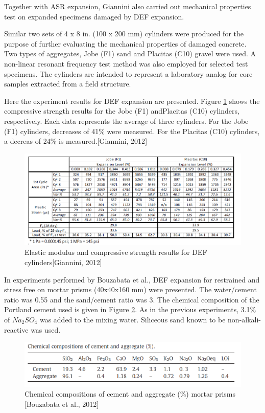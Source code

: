 \clearpage

Together with ASR expansion, Giannini\cite{GIANNINI} also carried out mechanical properties test on expanded specimens damaged by DEF expansion.

Similar two sets of 4 x 8 in. (100 x 200 mm) cylinders were produced for the purpose of further evaluating the mechanical properties of damaged concrete. Two types of aggregates, Jobe (F1) sand and Placitas (C10) gravel were used. A non-linear resonant frequency test method was also employed for selected test specimens. The cylinders are intended to represent a laboratory analog for core samples extracted from a field structure.

Here the experiment results for DEF expansion are presented. Figure \ref{Giannini, 2012 DEF} shows the compressive strength results for the Jobe (F1) andPlacitas (C10) cylinders, respectively. Each data represents the average of three cylinders. For the Jobe (F1) cylinders, decreases of 41\% were measured. For the Placitas (C10) cylinders, a decreas of 24\% is measured.[Giannini, 2012\cite{GIANNINI}]

\begin{figure}[h!]
  \centering
  \includegraphics[width=0.8\linewidth]{Reference/GIANNINIDEF.png}
  \caption{Elastic modulus and compressive strength results for DEF cylinders[Giannini, 2012\cite{GIANNINI}]}
  \label{Giannini, 2012 DEF}
\end{figure}

\clearpage

In experiments performed by Bouzabata et al.\cite{Bouzabata}, DEF expansion for restrained and stress free on mortar prisms (40x40x160 mm) were presented. The water/cement ratio was 0.55 and the sand/cement ratio was 3. The chemical composition of the Portland cement used is given in Figure \ref{Bouzabata (2012)1}. As in the previous experiments, 3.1\% of $Na_2SO_4$ was added to the mixing water. Siliceous sand known to be non-alkali-reactive was used.

\begin{figure}[h!]
  \centering
  \includegraphics[width=0.8\linewidth]{Reference/Bouzabata1.png}
  \caption{Chemical compositions of cement and aggregate (\%) mortar prisms [Bouzabata et al., 2012\cite{Bouzabata}]}
  \label{Bouzabata (2012)1}
\end{figure}


